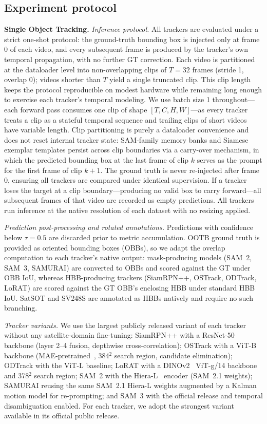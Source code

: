 \documentclass{article}
\newcommand{\subhead}[1]{\noindent\textbf{#1.}}
\newcommand{\minihead}[1]{\noindent\textit{#1.}}
\begin{document}
\subsection{Experiment protocol}
%
\subhead{Single Object Tracking} \minihead{Inference protocol} All trackers are evaluated under a strict
one-shot protocol: the ground-truth bounding box is injected only at frame 0 of
each video, and every subsequent frame is produced by the tracker's own temporal
propagation, with no further GT correction. Each video is partitioned at the
dataloader level into non-overlapping clips of $T{=}32$ frames (stride 1,
overlap 0); videos shorter than $T$ yield a single truncated clip. This clip
length keeps the protocol reproducible on modest hardware while remaining long
enough to exercise each tracker's temporal modeling. We use batch size 1
throughout---each forward pass consumes one clip of shape $[T,C,H,W]$---as every
tracker treats a clip as a stateful temporal sequence and trailing clips of
short videos have variable length. Clip partitioning is purely a dataloader
convenience and does not reset internal tracker state: SAM-family memory banks
and Siamese exemplar templates persist across clip boundaries via a carry-over
mechanism, in which the predicted bounding box at the last frame of clip $k$
serves as the prompt for the first frame of clip $k{+}1$. The ground truth is
never re-injected after frame 0, ensuring all trackers are compared under
identical supervision. If a tracker loses the target at a clip
boundary---producing no valid box to carry forward---all subsequent frames of
that video are recorded as empty predictions. All trackers run inference at the
native resolution of each dataset with no resizing applied.

\minihead{Prediction post-processing and rotated annotations}
Predictions with confidence below $\tau{=}0.5$ are discarded prior to metric
accumulation. OOTB ground truth is provided as oriented bounding boxes (OBBs),
so we adapt the overlap computation to each tracker's native output:
mask-producing models (SAM~2, SAM~3, SAMURAI) are converted to OBBs and scored
against the GT under OBB IoU, whereas HBB-producing trackers (SiamRPN++,
OSTrack, ODTrack, LoRAT) are scored against the GT OBB's enclosing HBB under
standard HBB IoU. SatSOT and SV248S are annotated as HBBs natively and require
no such branching.

\minihead{Tracker variants} We use the largest publicly released variant
of each tracker without any satellite-domain fine-tuning: SiamRPN++ with a
ResNet-50~\citep{he2016resnet} backbone (layer 2--4 fusion, depthwise
cross-correlation); OSTrack with a ViT-B~\citep{dosovitskiy2021vit}
backbone (MAE-pretrained~\citep{he2022mae}, 384$^2$ search region,
candidate elimination); ODTrack with the ViT-L baseline; LoRAT with a
DINOv2~\citep{oquab2024dinov2} ViT-g/14 backbone and 378$^2$ search
region; SAM~2 with the Hiera-L~\citep{ryali2023hiera} encoder (SAM~2.1
weights); SAMURAI reusing the same SAM~2.1 Hiera-L weights augmented by a
Kalman motion model for re-prompting; and SAM~3 with the official release
and temporal disambiguation enabled. For each tracker, we adopt the
strongest variant available in its official public release.
\end{document}
